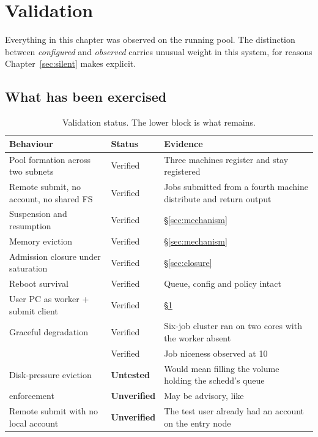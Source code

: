 \section{Validation}
\label{sec:eval}

Everything in this chapter was observed on the running pool. The distinction
between \emph{configured} and \emph{observed} carries unusual weight in this
system, for reasons Chapter~\ref{sec:silent} makes explicit.

\subsection{What has been exercised}

\begin{table}[H]
\centering
\begin{tabularx}{\textwidth}{L{0.34\textwidth} L{0.15\textwidth} Y}
\toprule
\textbf{Behaviour} & \textbf{Status} & \textbf{Evidence} \\
\midrule
Pool formation across two subnets & Verified & Three machines register and stay registered \\
Remote submit, no account, no shared FS & Verified & Jobs submitted from a fourth machine distribute and return output \\
Suspension and resumption & Verified & \S\ref{sec:mechanism} \\
Memory eviction & Verified & \S\ref{sec:mechanism} \\
Admission closure under saturation & Verified & \S\ref{sec:closure} \\
Reboot survival & Verified & Queue, config and policy intact \\
User PC as worker + submit client & Verified & \S\ref{sec:eval} \\
Graceful degradation & Verified & Six-job cluster ran on two cores with the worker absent \\
 & Verified & Job niceness observed at 10 \\
\midrule
Disk-pressure eviction & \textbf{Untested} & Would mean filling the volume holding the schedd's queue \\
 enforcement & \textbf{Unverified} & May be advisory, like  \\
Remote submit with no local account & \textbf{Unverified} & The test user already had an account on the entry node \\
\bottomrule
\end{tabularx}
\caption{Validation status. The lower block is what remains.}
\end{table}

